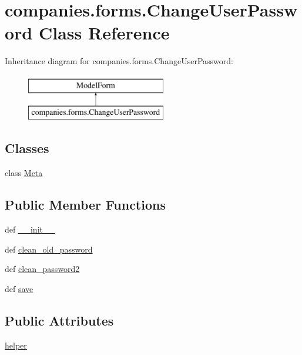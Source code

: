 \hypertarget{classcompanies_1_1forms_1_1_change_user_password}{\section{companies.\-forms.\-Change\-User\-Password Class Reference}
\label{classcompanies_1_1forms_1_1_change_user_password}
}
Inheritance diagram for companies.\-forms.\-Change\-User\-Password\-:\begin{figure}[H]
\begin{center}
\leavevmode
\includegraphics[height=2.000000cm]{classcompanies_1_1forms_1_1_change_user_password}
\end{center}
\end{figure}
\subsection*{Classes}
\begin{DoxyCompactItemize}
\item 
class \hyperlink{classcompanies_1_1forms_1_1_change_user_password_1_1_meta}{Meta}
\end{DoxyCompactItemize}
\subsection*{Public Member Functions}
\begin{DoxyCompactItemize}
\item 
def \hyperlink{classcompanies_1_1forms_1_1_change_user_password_a7c254184cffbf0a159581cfc21726b41}{\-\_\-\-\_\-init\-\_\-\-\_\-}
\item 
def \hyperlink{classcompanies_1_1forms_1_1_change_user_password_a263d4412bfb2f4e52fa4e3729b32f41f}{clean\-\_\-old\-\_\-password}
\item 
def \hyperlink{classcompanies_1_1forms_1_1_change_user_password_a6ec8c0289ca1482248ceb9f8e4218781}{clean\-\_\-password2}
\item 
def \hyperlink{classcompanies_1_1forms_1_1_change_user_password_a42540bb1abd1d3800eef74fc33444f01}{save}
\end{DoxyCompactItemize}
\subsection*{Public Attributes}
\begin{DoxyCompactItemize}
\item 
\hyperlink{classcompanies_1_1forms_1_1_change_user_password_a140e79dc3ff62bec229a256dfb968903}{helper}
\end{DoxyCompactItemize}

